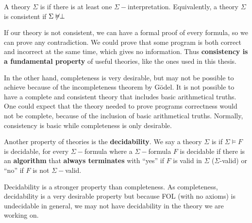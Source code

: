A theory $\Sigma$ is  if there is at least one $\Sigma-$interpretation.	Equivalently, a theory $\Sigma$ is consistent if $\Sigma \not\vDash \perp$

If our theory is not consistent, we can have a formal proof of every formula, so we can prove any contradiction. 
%
We could prove that some program is both correct and incorrect at the same time, which gives no information. 
%
Thus \textbf{consistency is a fundamental property} of useful theories, like the ones used in this thesis.

\label{intr:consistency}
In the other hand, completeness is very desirable, but may not be possible to achieve because of the incompleteness theorem by Gödel.
%
It is not possible to have a complete and consistent theory that includes basic arithmetical truths. 
%
One could expect that the theory needed to prove programs correctness would not be complete, because of the inclusion of basic arithmetical truths. 
%
Normally, consistency is basic while completeness is only desirable.

Another property of theories is the \textbf{decidability}. 
%
We say a theory $\Sigma$ is  if $\Sigma \vDash F$ is decidable, for every $\Sigma-$formula 
where a $\Sigma-$formula $F$ is decidable if there is an \textbf{algorithm} that \textbf{always terminates} with ``yes'' if $F$ is valid in $\Sigma$ ($\Sigma$-valid) or ``no'' if $F$ is not $\Sigma-$valid.


Decidability is a stronger property than completeness. 
%
As completeness, decidability is a very desirable property but because \gls{FOL} (with no axioms) is undecidable in general, we may not have decidability in the theory we are working on.



